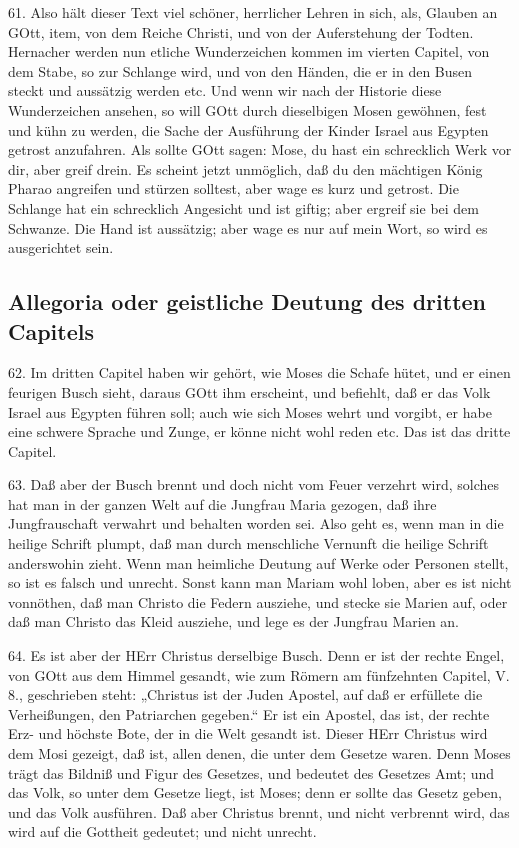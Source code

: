 61. Also hält dieser Text viel schöner, herrlicher Lehren in sich, als, Glauben an GOtt, item, von dem Reiche Christi, und von der Auferstehung der Todten. Hernacher werden nun etliche Wunderzeichen kommen im vierten Capitel, von dem Stabe, so zur Schlange wird, und von den Händen, die er in den Busen steckt und aussätzig werden etc. Und wenn wir nach der Historie diese Wunderzeichen ansehen, so will GOtt durch dieselbigen Mosen gewöhnen, fest und kühn zu werden, die Sache der Ausführung der Kinder Israel aus Egypten getrost anzufahren. Als sollte GOtt sagen: Mose, du hast ein schrecklich Werk vor dir, aber greif drein. Es scheint jetzt unmöglich, daß du den mächtigen König Pharao angreifen und stürzen solltest, aber wage es kurz und getrost. Die Schlange hat ein schrecklich Angesicht und ist giftig; aber ergreif sie bei dem Schwanze. Die Hand ist aussätzig; aber wage es nur auf mein Wort, so wird es ausgerichtet sein.

\subsection{Allegoria oder geistliche Deutung des dritten Capitels}

62. Im dritten Capitel haben wir gehört, wie Moses die Schafe hütet, und er einen feurigen Busch sieht, daraus GOtt ihm erscheint, und befiehlt, daß er das Volk Israel aus Egypten führen soll; auch wie sich Moses wehrt und vorgibt, er habe eine schwere Sprache und Zunge, er könne nicht wohl reden etc. Das ist das dritte Capitel.

63. Daß aber der Busch brennt und doch nicht vom Feuer verzehrt wird, solches hat man in der ganzen Welt auf die Jungfrau Maria gezogen, daß ihre Jungfrauschaft verwahrt und behalten worden sei. Also geht es, wenn man in die heilige Schrift plumpt, daß man durch menschliche Vernunft die heilige Schrift anderswohin zieht. Wenn man heimliche Deutung auf Werke oder Personen stellt, so ist es falsch und unrecht. Sonst kann man Mariam wohl loben, aber es ist nicht vonnöthen, daß man Christo die Federn ausziehe, und stecke sie Marien auf, oder daß man Christo das Kleid ausziehe, und lege es der Jungfrau Marien an.

64. Es ist aber der HErr Christus derselbige Busch. Denn er ist der rechte Engel, von GOtt aus dem Himmel gesandt, wie zum Römern am fünfzehnten Capitel, V. 8., geschrieben steht: „Christus ist der Juden Apostel, auf daß er erfüllete die Verheißungen, den Patriarchen gegeben.“ Er ist ein Apostel, das ist, der rechte Erz- und höchste Bote, der in die Welt gesandt ist. Dieser HErr Christus wird dem Mosi gezeigt, daß ist, allen denen, die unter dem Gesetze waren. Denn Moses trägt das Bildniß und Figur des Gesetzes, und bedeutet des Gesetzes Amt; und das Volk, so unter dem Gesetze liegt, ist Moses; denn er sollte das Gesetz geben, und das Volk ausführen. Daß aber Christus brennt, und nicht verbrennt wird, das wird auf die Gottheit gedeutet; und nicht unrecht.

